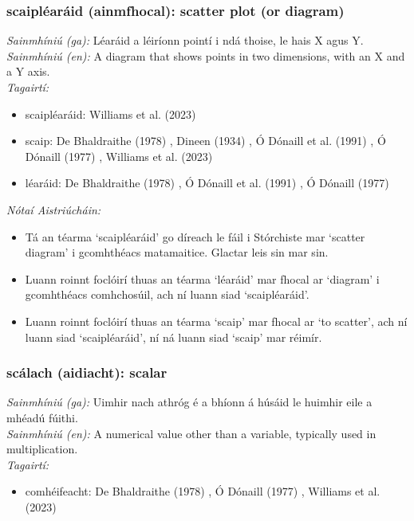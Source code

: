 \documentclass{article}
\begin{document}
\subsubsection*{scaipléaráid (ainmfhocal): scatter plot (or diagram)}
 \noindent \textit{Sainmhíniú (ga):} Léaráid a léiríonn pointí i ndá thoise, le hais X agus Y.
\\
 \noindent \textit{Sainmhíniú (en):} A diagram that shows points in two dimensions, with an X and a Y axis.
\\
 \noindent \textit{Tagairtí:}
\begin{itemize}
	\item scaipléaráid: Williams et al. (2023) \cite{storchiste}
	\item scaip: De Bhaldraithe (1978) \cite{de-bhaldraithe}, Dineen (1934) \cite{dineen}, Ó Dónaill et al. (1991) \cite{focloir-beag}, Ó Dónaill (1977) \cite{odonaill}, Williams et al. (2023) \cite{storchiste}
	\item léaráid: De Bhaldraithe (1978) \cite{de-bhaldraithe}, Ó Dónaill et al. (1991) \cite{focloir-beag}, Ó Dónaill (1977) \cite{odonaill}
\end{itemize}

 \noindent \textit{Nótaí Aistriúcháin:}
\begin{itemize}
	\item Tá an téarma `scaipléaráid' go díreach le fáil i Stórchiste mar `scatter diagram' i gcomhthéacs matamaitice. Glactar leis sin mar sin.
	\item Luann roinnt foclóirí thuas an téarma `léaráid' mar fhocal ar `diagram' i gcomhthéacs comhchosúil, ach ní luann siad `scaipléaráid'.
	\item Luann roinnt foclóirí thuas an téarma `scaip' mar fhocal ar `to scatter', ach ní luann siad `scaipléaráid', ní ná luann siad `scaip' mar réimír.
\end{itemize}


\subsubsection*{scálach (aidiacht): scalar}
 \noindent \textit{Sainmhíniú (ga):} Uimhir nach athróg é a bhíonn á húsáid le huimhir eile a mhéadú fúithi.
\\
 \noindent \textit{Sainmhíniú (en):} A numerical value other than a variable, typically used in multiplication.
\\
 \noindent \textit{Tagairtí:}
\begin{itemize}
	\item comhéifeacht: De Bhaldraithe (1978) \cite{de-bhaldraithe}, Ó Dónaill (1977) \cite{odonaill}, Williams et al. (2023) \cite{storchiste}
\end{itemize}
\end{document}
